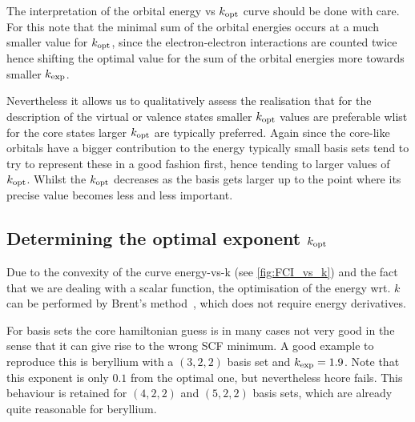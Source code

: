 The interpretation of the orbital energy vs $k_\text{opt}$ curve
should be done with care.
For this note that the minimal sum of the orbital energies
occurs at a much smaller value for $k_\text{opt}$,
since the electron-electron interactions are counted twice
hence shifting the optimal value for the sum of the orbital
energies more towards smaller $k_\text{exp}$.

Nevertheless it allows us to qualitatively assess the realisation
that for the description of the virtual or valence states
smaller $k_\text{opt}$ values are preferable wlist for the core states
larger $k_\text{opt}$ are typically preferred.
Again since the core-like orbitals have a bigger contribution
to the energy typically small basis sets tend to try to represent
these in a good fashion first, hence tending to larger values of $k_\text{opt}$.
Whilst the $k_\text{opt}$ decreases as the basis gets larger up to the point
where its precise value becomes less and less important.




\subsection{Determining the optimal exponent $k_\text{opt}$}
Due to the convexity of the curve energy-vs-k (see \vref{fig:FCI_vs_k})
and the fact that we are dealing with a scalar function,
the optimisation of the energy wrt. $k$ can be performed by
Brent's method~\cite{Brent1972},
which does not require energy derivatives.

For \CS basis sets the core hamiltonian guess is in many cases not very good
in the sense that it can give rise to the wrong SCF minimum.
A good example to reproduce this is beryllium with a $(3, 2, 2)$ \CS basis
set and $k_\text{exp} = 1.9$.
Note that this exponent is only $0.1$ from the optimal one,
but nevertheless hcore fails.
This behaviour is retained for $(4,2,2)$ and $(5,2,2)$ basis sets,
which are already quite reasonable for beryllium.

